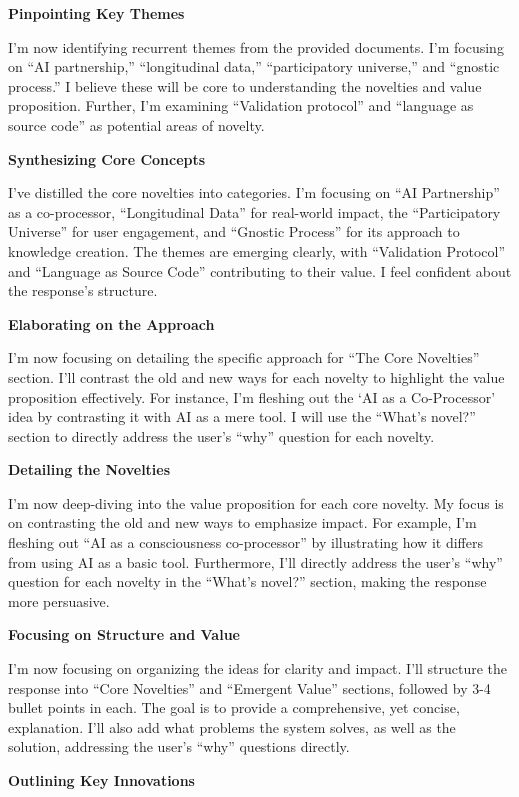 \documentclass{article}
\begin{document}
\textbf{Pinpointing Key Themes}

I'm now identifying recurrent themes from the provided documents. I'm
focusing on ``AI partnership,'' ``longitudinal data,'' ``participatory
universe,'' and ``gnostic process.'' I believe these will be core to
understanding the novelties and value proposition. Further, I'm
examining ``Validation protocol'' and ``language as source code'' as
potential areas of novelty.

\textbf{Synthesizing Core Concepts}

I've distilled the core novelties into categories. I'm focusing on ``AI
Partnership'' as a co-processor, ``Longitudinal Data'' for real-world
impact, the ``Participatory Universe'' for user engagement, and
``Gnostic Process'' for its approach to knowledge creation. The themes
are emerging clearly, with ``Validation Protocol'' and ``Language as
Source Code'' contributing to their value. I feel confident about the
response's structure.

\textbf{Elaborating on the Approach}

I'm now focusing on detailing the specific approach for ``The Core
Novelties'' section. I'll contrast the old and new ways for each novelty
to highlight the value proposition effectively. For instance, I'm
fleshing out the `AI as a Co-Processor' idea by contrasting it with AI
as a mere tool. I will use the ``What's novel?'' section to directly
address the user's ``why'' question for each novelty.

\textbf{Detailing the Novelties}

I'm now deep-diving into the value proposition for each core novelty. My
focus is on contrasting the old and new ways to emphasize impact. For
example, I'm fleshing out ``AI as a consciousness co-processor'' by
illustrating how it differs from using AI as a basic tool. Furthermore,
I'll directly address the user's ``why'' question for each novelty in
the ``What's novel?'' section, making the response more persuasive.

\textbf{Focusing on Structure and Value}

I'm now focusing on organizing the ideas for clarity and impact. I'll
structure the response into ``Core Novelties'' and ``Emergent Value''
sections, followed by 3-4 bullet points in each. The goal is to provide
a comprehensive, yet concise, explanation. I'll also add what problems
the system solves, as well as the solution, addressing the user's
``why'' questions directly.

\textbf{Outlining Key Innovations}
\end{document}

